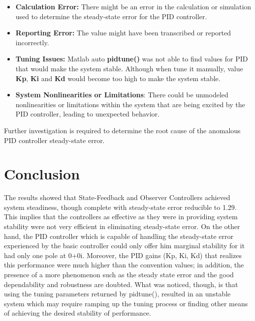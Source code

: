 \documentclass[a4paper,12pt]{article}
\begin{document}
\begin{itemize}
    \item \textbf{Calculation Error:} There might be an error in the calculation or simulation used to determine the steady-state error for the PID controller.
    \item \textbf{Reporting Error:} The value might have been transcribed or reported incorrectly.
    \item \textbf{Tuning Issues:} Matlab auto \textbf{pidtune()} was not able to find values for PID that would make the system stable. Although when tune it manually, value \textbf{Kp}, \textbf{Ki} and \textbf{Kd} would become too high to make the system stable. 
    \item \textbf{System Nonlinearities or Limitations}: There could be unmodeled nonlinearities or limitations within the system that are being excited by the PID controller, leading to unexpected behavior.
\end{itemize}

Further investigation is required to determine the root cause of the anomalous PID controller steady-state error.

\section*{Conclusion}
The results showed that State-Feedback and Observer Controllers achieved system steadiness, though complete with steady-state error reducible to 1.29. This implies that the controllers as effective as they were in providing system stability were not very efficient in eliminating steady-state error. On the other hand, the PID controller which is capable of handling the steady-state error experienced by the basic controller could only offer him marginal stability for it had only one pole at 
0+0i. Moreover, the PID gains (Kp, Ki, Kd) that realizes this performance were much higher than the convention values; in addition, the presence of a more phenomenon such as the steady state error and the good dependability and robustness are doubted. What was noticed, though, is that using the tuning parameters returned by pidtune(), resulted in an unstable system which may require ramping up the tuning process or finding other means of achieving the desired stability of performance.
\end{document}
